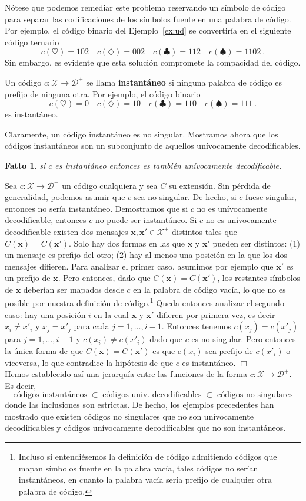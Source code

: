 \documentclass[11pt]{article}
\newtheorem{fact}[theorem]{Fatto}
\newenvironment{proof}{{\textsc{Dimostrazione.}\ }}{\hfill$\Box$\\[2mm]}
\newcommand{\bx}{ \boldsymbol{x} }
\newcommand{\scD}{\mathcal{D}}
\newcommand{\scX}{\mathcal{X}}
\begin{document}
Nótese que podemos remediar este problema reservando un símbolo de código para separar las codificaciones de los símbolos fuente en una palabra de código. Por ejemplo, el código binario del Ejemplo~\ref{ex:ud} se convertiría en el siguiente código ternario
\[
    c(\heartsuit) = 102 \quad c(\diamondsuit) = 002 \quad c(\clubsuit) = 112 \quad c(\spadesuit) = 1102~.
\]
Sin embargo, es evidente que esta solución compromete la compacidad del código.

Un código $c : \scX \to \scD^+$ se llama \textbf{instantáneo} si ninguna palabra de código es prefijo de ninguna otra. Por ejemplo, el código binario
\[
    c(\heartsuit) = 0 \quad c(\diamondsuit) = 10 \quad c(\clubsuit) = 110 \quad c(\spadesuit) = 111~.
\]
es instantáneo.

Claramente, un código instantáneo es no singular. Mostramos ahora que los códigos instantáneos son un subconjunto de aquellos unívocamente decodificables.
%
\begin{fact}
si $c$ es instantáneo entonces es también unívocamente decodificable.
\end{fact}
%
\begin{proof}
Sea $c : \scX\to\scD^+$ un código cualquiera y sea $C$ su extensión. Sin pérdida de generalidad, podemos asumir que $c$ sea no singular. De hecho, si $c$ fuese singular, entonces no sería instantáneo. Demostramos que si $c$ no es unívocamente decodificable, entonces $c$ no puede ser instantáneo. Si $c$ no es unívocamente decodificable existen dos mensajes $\bx,\bx'\in\scX^+$ distintos tales que $C(\bx) = C(\bx')$. Solo hay dos formas en las que $\bx$ y $\bx'$ pueden ser distintos: (1) un mensaje es prefijo del otro; (2) hay al menos una posición en la que los dos mensajes difieren. Para analizar el primer caso, asumimos por ejemplo que $\bx'$ es un prefijo de $\bx$. Pero entonces, dado que $C(\bx) = C(\bx')$, los restantes símbolos de $\bx$ deberían ser mapados desde $c$ en la palabra de código vacía, lo que no es posible por nuestra definición de código.\footnote{Incluso si entendiésemos la definición de código admitiendo códigos que mapan símbolos fuente en la palabra vacía, tales códigos no serían instantáneos, en cuanto la palabra vacía sería prefijo de cualquier otra palabra de código.} Queda entonces analizar el segundo caso: hay una posición $i$ en la cual $\bx$ y $\bx'$ difieren por primera vez, es decir $x_i \neq x'_i$ y $x_j = x'_j$ para cada $j = 1,\dots,i-1$. Entonces tenemos $c(x_j)=c(x'_j)$ para $j=1,\dots,i-1$ y $c(x_i) \neq c(x'_i)$ dado que $c$ es no singular. Pero entonces la única forma de que $C(\bx) = C(\bx')$ es que $c(x_i)$ sea prefijo de $c(x'_i)$ o viceversa, lo que contradice la hipótesis de que $c$ es instantáneo.
\end{proof}
%
Hemos establecido así una jerarquía entre las funciones de la forma $c:\scX\to\scD^+$. Es decir,
\[
    \text{códigos instantáneos} \;\subset\; \text{códigos univ.\ decodificables} \;\subset\; \text{códigos no singulares}
\]
donde las inclusiones son estrictas. De hecho, los ejemplos precedentes han mostrado que existen códigos no singulares que no son unívocamente decodificables y códigos unívocamente decodificables que no son instantáneos.
\end{document}

